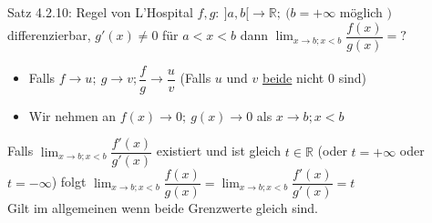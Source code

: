 \documentclass[a4paper,10pt]{article}
\begin{document}
\begin{tbox}
    {Satz 4.2.10: Regel von L'Hospital}
    $f,g:\ ]a,b[\longrightarrow \mathbb R; \ (b=+\infty$ möglich $)$ differenzierbar, $g'(x)\neq 0$ für $a<x<b$ dann $\lim_{x\to b; x<b}\dfrac{f(x)}{g(x)}=?$
    \begin{itemize}
        \item Falls $f\longrightarrow u;\ g\longrightarrow v; \dfrac{f}{g}\longrightarrow\dfrac{u}{v}$ (Falls $u$ und $v$ \underline{beide} nicht $0$ sind)
        \item  Wir nehmen an $f(x)\longrightarrow 0;\ g(x)\longrightarrow 0$ als $x\longrightarrow b; x<b$
    \end{itemize}
    Falls $\lim_{x\to b; x<b}\dfrac{f'(x)}{g'(x)}$ existiert und ist gleich $t\in \mathbb R$ (oder $t=+\infty$ oder $t=-\infty$) folgt $\lim_{x\to b; x<b}\dfrac{f(x)}{g(x)}=\lim_{x\to b; x<b}\dfrac{f'(x)}{g'(x)}=t$
    \\ Gilt im allgemeinen wenn beide Grenzwerte gleich sind.
\end{tbox} 
\end{document}
